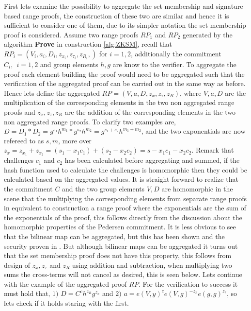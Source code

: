 First lets examine the possibility to aggregate the set membership and signature based range proofs, the construction of these two are similar and hence it is sufficient to consider one of them, due to  its simpler notation the set membership proof is considered. Assume two range proofs $RP_1$ and $RP_2$ generated by the algorithm \textbf{Prove} in construction \ref{alg:ZKSM}, recall that $RP_i = (V_i,a_i,D_i,z_{x_i},z_{\tau _i},z_{R_i}, )$ for $i=1,2$,  additionally the commitment $C_i, \:\: i=1,2$ and group elements $h,g$ are know to the verifier. To aggregate the proof each element building the proof would need to be aggregated such that the verification of the aggregated proof can be carried out in the same way as before. 
Hence lets define the aggregated  $RP = (V,a,D,z_{x},z_{\tau },z_{R})$, where $V, a, D$ are the multiplication of the corresponding elements in the two non aggregated range proofs and $z_{x},z_{\tau },z_{R}$ are the addition of the corresponding elements in the two non aggregated range proofs. To clarify two examples are, $D=D_1*D_2 =g^{s_1}h^{m_1}*g^{s_2}h^{m_2} = g^{s_1+s_2}h^{m_1+m_2}$, and the two exponentials are now refereed to as $s,m$, more over $z_x = z_{x_1}+z_{x_2} = (s_1-x_1c_1 )+ (s_2-x_2c_2) = s- x_1c_1-x_2c_2 $. Remark that challenges $c_1$ and $c_2$ has been calculated before aggregating and summed, if the hash function used to calculate the challenges is homomorphic then they could be calculated based on the aggregated values. It is straight forward to realize that the commitment $C$ and the two group elements $V,D$ are homomorphic in the scene that the multiplying the corresponding elements from separate range proofs in equivalent to construction a range proof where the exponentials are the sum of the exponentials of the proof, this follows directly from the discussion about the homomorphic properties of the Pedersen commitment. It is less obvious to see that the bilinear map can be aggregated, but this has been shown and the security proven in \cite{aggregate_bm}. But although bilinear maps can be aggregated it turns out that the set membership proof does not have this property, this follows from design of $z_x,z_\tau $ and $z_R$ using addition and subtraction, when multiplying two sums the cross-terms will not cancel as desired, this is seen below. Lets continue with the example of the aggregated proof $RP$. For the verification to success it must hold that, $1)$ $D= C^ch^{z_R}g^{z_x}$ and $2)$ $ a = e(V,y)^ce(V,g)^{-z_x}e(g,g)^{z_\tau}$, so lets check if it holds staring with the first.

